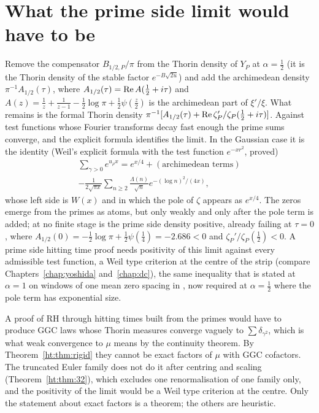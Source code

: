 \section{What the prime side limit would have to be}\label{ht:sec:target}

Remove the compensator $B_{1/2,P}/\pi$ from the Thorin density of $Y_P$ at $\alpha=\frac12$ (it is the Thorin density of the stable factor $e^{-B\sqrt{2u}}$) and add the archimedean density $\pi^{-1}A_{1/2}(\tau)$, where $A_{1/2}(\tau)=\operatorname{Re} A(\tfrac12+i\tau)$ and $A(z)=\frac1z+\frac1{z-1}-\frac12\log\pi+\frac12\psi(\frac z2)$ is the archimedean part of $\xi'/\xi$. What remains is the formal Thorin density $\pi^{-1}[A_{1/2}(\tau)+\operatorname{Re}\zeta_P'/\zeta_P(\tfrac12+i\tau)]$. Against test functions whose Fourier transforms decay fast enough the prime sums converge, and the explicit formula identifies the limit. In the Gaussian case it is the identity (Weil's explicit formula with the test function $e^{-xr^2}$, proved)
\begin{multline*}
\sum_{\gamma>0}e^{u_\rho x}=e^{x/4}+(\text{archimedean terms})\\
-\frac1{2\sqrt{\pi x}}\sum_{n\ge2}\frac{\Lambda(n)}{\sqrt n}e^{-(\log n)^2/(4x)},
\end{multline*}
whose left side is $W(x)$ and in which the pole of $\zeta$ appears as $e^{x/4}$. The zeros emerge from the primes as atoms, but only weakly and only after the pole term is added; at no finite stage is the prime side density positive, already failing at $\tau=0$, where $A_{1/2}(0)=-\frac12\log\pi+\frac12\psi(\frac14)=-2.686<0$ and $\zeta_P'/\zeta_P(\frac12)<0$. A prime side hitting time proof needs positivity of this limit against every admissible test function, a Weil type criterion at the centre of the strip (compare Chapters~\ref{chap:yoshida} and~\ref{chap:dc}), the same inequality that is stated at $\alpha=1$ on windows of one mean zero spacing in \cite{P17}, now required at $\alpha=\frac12$ where the pole term has exponential size. %

\begin{remark}\label{ht:cor:shape}
A proof of RH through hitting times built from the primes would have to produce GGC laws whose Thorin measures converge vaguely to $\sum\delta_{\gamma^2}$, which is what weak convergence to $\mu$ means by the continuity theorem. By Theorem~\ref{ht:thm:rigid} they cannot be exact factors of $\mu$ with GGC cofactors. The truncated Euler family does not do it after centring and scaling (Theorem~\ref{ht:thm:32}), which excludes one renormalisation of one family only, and the positivity of the limit would be a Weil type criterion at the centre. Only the statement about exact factors is a theorem; the others are heuristic.
\end{remark}

